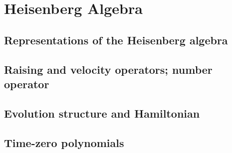 \chapter{Heisenberg Algebra}
\label{ch:10}
\section{Representations of the Heisenberg algebra}
\label{sec:10-1}

\section{Raising and velocity operators; number operator}
\label{sec:10-2}

\section{Evolution structure and Hamiltonian}
\label{sec:10-3}

\section{Time-zero polynomials}
\label{sec:10-4}

